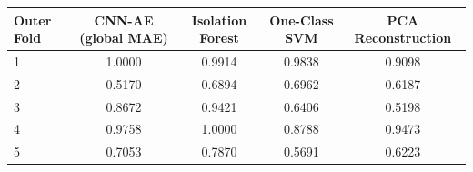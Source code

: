 \begin{tabular}{lcccc}
\toprule
Outer Fold & CNN-AE (global MAE) & Isolation Forest & One-Class SVM & PCA Reconstruction \\
\midrule
1 & 1.0000 & 0.9914 & 0.9838 & 0.9098 \\
2 & 0.5170 & 0.6894 & 0.6962 & 0.6187 \\
3 & 0.8672 & 0.9421 & 0.6406 & 0.5198 \\
4 & 0.9758 & 1.0000 & 0.8788 & 0.9473 \\
5 & 0.7053 & 0.7870 & 0.5691 & 0.6223 \\
\bottomrule
\end{tabular}
